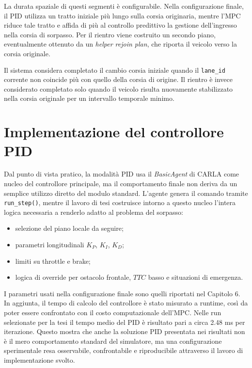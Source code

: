La durata spaziale di questi segmenti è configurabile. Nella configurazione finale, il PID utilizza un tratto iniziale più lungo sulla corsia originaria, mentre l'MPC riduce tale tratto e affida di più al controllo predittivo la gestione dell'ingresso nella corsia di sorpasso. Per il rientro viene costruito un secondo piano, eventualmente ottenuto da un \textit{helper rejoin plan}, che riporta il veicolo verso la corsia originale.

Il sistema considera completato il cambio corsia iniziale quando il \texttt{lane\_id} corrente non coincide più con quello della corsia di origine. Il rientro è invece considerato completato solo quando il veicolo risulta nuovamente stabilizzato nella corsia originale per un intervallo temporale minimo.

\section{Implementazione del controllore PID}

Dal punto di vista pratico, la modalità PID usa il \textit{BasicAgent} di CARLA come nucleo del controllore principale, ma il comportamento finale non deriva da un semplice utilizzo diretto del modulo standard. L'agente genera il comando tramite \texttt{run\_step()}, mentre il lavoro di tesi costruisce intorno a questo nucleo l'intera logica necessaria a renderlo adatto al problema del sorpasso:

\begin{itemize}
    \item selezione del piano locale da seguire;
    \item parametri longitudinali \(K_P\), \(K_I\), \(K_D\);
    \item limiti su throttle e brake;
    \item logica di override per ostacolo frontale, \(TTC\) basso e situazioni di emergenza.
\end{itemize}

I parametri usati nella configurazione finale sono quelli riportati nel Capitolo 6. In aggiunta, il tempo di calcolo del controllore è stato misurato a runtime, così da poter essere confrontato con il costo computazionale dell'MPC. Nelle run selezionate per la tesi il tempo medio del PID è risultato pari a circa 2.48 ms per iterazione. Questo mostra che anche la soluzione PID presentata nei risultati non è il mero comportamento standard del simulatore, ma una configurazione sperimentale resa osservabile, confrontabile e riproducibile attraverso il lavoro di implementazione svolto.


